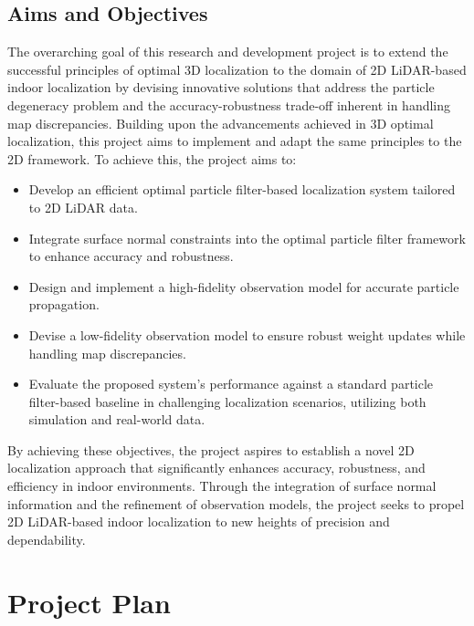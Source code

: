 \documentclass[rnd]{mas_proposal}
\begin{document}
\subsection{Aims and Objectives}
The overarching goal of this research and development project is to extend the successful principles of optimal 3D localization to the domain of 2D LiDAR-based indoor localization by devising innovative solutions that address the particle degeneracy problem and the accuracy-robustness trade-off inherent in handling map discrepancies. Building upon the advancements achieved in 3D optimal localization, this project aims to implement and adapt the same principles to the 2D framework.
To achieve this, the project aims to:
\begin{itemize}
    \item Develop an efficient optimal particle filter-based localization system tailored to 2D LiDAR data.
    \item Integrate surface normal constraints into the optimal particle filter framework to enhance accuracy and robustness.
    \item Design and implement a high-fidelity observation model for accurate particle propagation.
    \item Devise a low-fidelity observation model to ensure robust weight updates while handling map discrepancies.
    \item Evaluate the proposed system's performance against a standard particle filter-based baseline in challenging localization scenarios, utilizing both simulation and real-world data.
\end{itemize}

By achieving these objectives, the project aspires to establish a novel 2D localization approach that significantly enhances accuracy, robustness, and efficiency in indoor environments. Through the integration of surface normal information and the refinement of observation models, the project seeks to propel 2D LiDAR-based indoor localization to new heights of precision and dependability.

\section{Project Plan}
\end{document}
